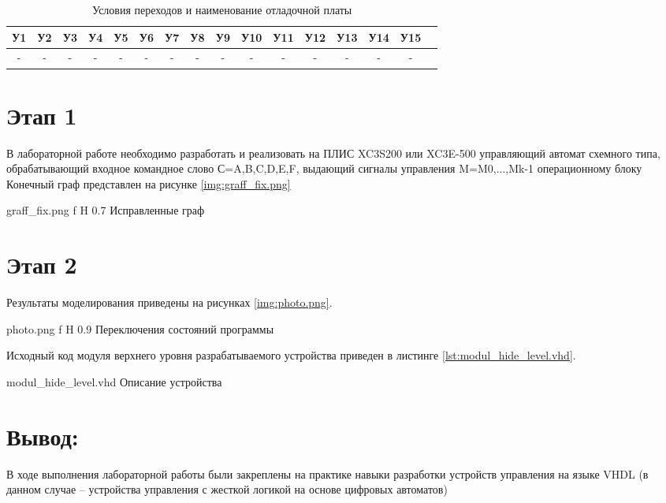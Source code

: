 \documentclass{bmstu}
\begin{document}
\begin{table}[ht]
        \begin{center}
        \caption{Условия переходов и наименование отладочной платы}
        \begin{tabular}{|c|c|c|c|c|c|c|c|c|c|c|c|c|c|c|c|}
                \hline 
                У1 & У2 & У3 & У4 & У5 & У6 & У7 & У8 & У9 & У10 & У11 & У12 & У13 & У14 & У15 \\
                \hline
                - & - & - & - & - & - & - & - & - & - & - & - & - & - & - \\
                \hline
        \end{tabular}
        \end{center}
\end{table}

\section*{Этап 1}

В лабораторной работе необходимо разработать и реализовать на ПЛИС
XC3S200 или XC3E-500 управляющий автомат схемного типа,
обрабатывающий входное командное слово С={A,B,C,D,E,F}, выдающий
сигналы управления M={M0,...,Mk-1} операционному блоку
Конечный граф представлен на рисунке \ref{img:graff_fix.png}

	{graff_fix.png}
	{f}
	{H}
	{0.7\textwidth}
	{Исправленные граф}

\section*{Этап 2}
	
Результаты моделирования приведены на рисунках \ref{img:photo.png}. 

	{photo.png}
	{f}
	{H}
	{0.9\textwidth}
	{Переключения состояний программы}

Исходный код модуля верхнего уровня разрабатываемого устройства
приведен в листинге \ref{lst:modul_hide_level.vhd}.

	{modul_hide_level.vhd}
	{Описание устройства}

\section*{Вывод:}
В ходе выполнения лабораторной работы были закреплены на
практике навыки разработки устройств управления на языке VHDL (в данном
случае – устройства управления с жесткой логикой на основе цифровых
автоматов)
\end{document}

